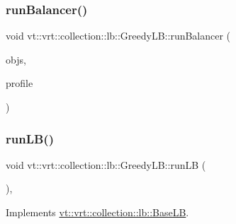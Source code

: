 \mbox{\label{structvt_1_1vrt_1_1collection_1_1lb_1_1_greedy_l_b_a1d99110d1226a5f843aab375e2949b7a}} 
\subsubsection{\texorpdfstring{run\+Balancer()}{runBalancer()}}
{\footnotesize\ttfamily void vt\+::vrt\+::collection\+::lb\+::\+Greedy\+L\+B\+::run\+Balancer (\begin{DoxyParamCaption}\item[{\hyperlink{structvt_1_1vrt_1_1collection_1_1lb_1_1_base_l_b_a331d7da5bbf2883238427d86b54ddd7b}{Obj\+Sample\+Type} \&\&}]{objs,  }\item[{\hyperlink{structvt_1_1vrt_1_1collection_1_1lb_1_1_greedy_l_b_a3db2c9b36ac99ed4aed38519be4aad60}{Load\+Profile\+Type} \&\&}]{profile }\end{DoxyParamCaption})\hspace{0.3cm}{\ttfamily [private]}}

\mbox{\label{structvt_1_1vrt_1_1collection_1_1lb_1_1_greedy_l_b_ab5e726f6fe7aa749ea6e0e2a45171d36}} 
\subsubsection{\texorpdfstring{run\+L\+B()}{runLB()}}
{\footnotesize\ttfamily void vt\+::vrt\+::collection\+::lb\+::\+Greedy\+L\+B\+::run\+LB (\begin{DoxyParamCaption}{ }\end{DoxyParamCaption})\hspace{0.3cm}{\ttfamily [override]}, {\ttfamily [virtual]}}



Implements \hyperlink{structvt_1_1vrt_1_1collection_1_1lb_1_1_base_l_b_a69a398c54f8129f365171a1189ffcd84}{vt\+::vrt\+::collection\+::lb\+::\+Base\+LB}.

